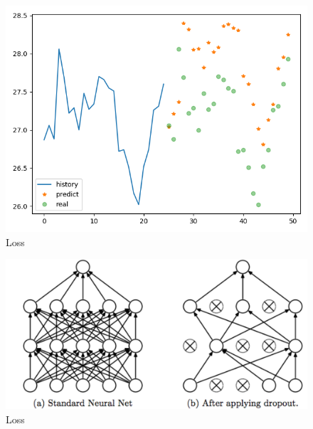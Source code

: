 \documentclass[
	article,			%
	11pt,				%
	oneside,			%
	a4paper,			%
	english,			%
	brazil,				%
	sumario=tradicional
	]{abntex2}
\begin{document}
\begin{anexosenv}
\begin{figure}[htb]
	\caption{\label{results-chart}Loss}
	\begin{center}
		\includegraphics[scale=0.5]{images/prevision_chart.png}
	\end{center}
\end{figure}


\begin{figure}[htb]
	\caption{\label{dropout}Loss}
	\begin{center}
		\includegraphics[scale=0.3]{images/with_without_dropout.png}
	\end{center}
\end{figure}


\end{anexosenv}
\end{document}
